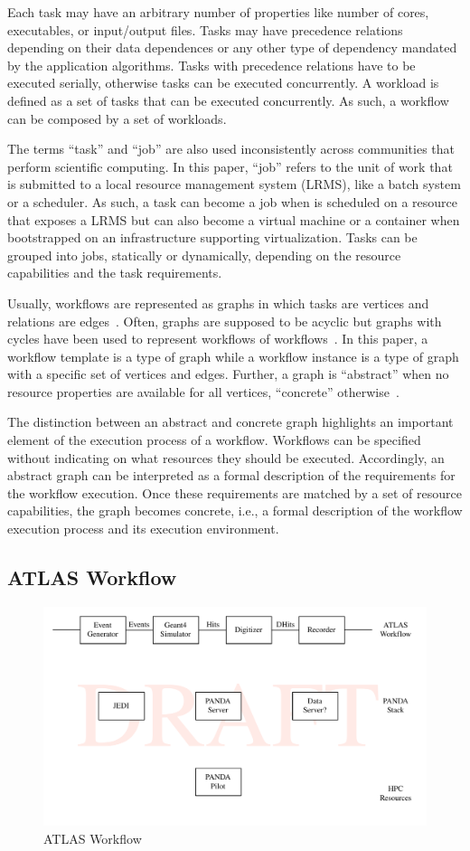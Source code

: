 Each task may have an arbitrary number of properties like number of cores,
executables, or input/output files. Tasks may have precedence relations
depending on their data dependences or any other type of dependency mandated
by the application algorithms. Tasks with precedence relations have to be
executed serially, otherwise tasks can be executed concurrently. A workload is
defined as a set of tasks that can be executed concurrently. As such, a
workflow can be composed by a set of workloads.

The terms ``task'' and ``job'' are also used inconsistently across communities
that perform scientific computing. In this paper, ``job'' refers to the unit of
work that is submitted to a local resource management system (LRMS), like a
batch system or a scheduler. As such, a task can become a job when is scheduled
on a resource that exposes a LRMS but can also become a virtual machine or a
container when bootstrapped on an infrastructure supporting virtualization.
Tasks can be grouped into jobs, statically or dynamically, depending on the
resource capabilities and the task requirements.

Usually, workflows are represented as graphs in which tasks are vertices and
relations are edges~\cite{}. Often, graphs are supposed to be acyclic but graphs
with cycles have been used to represent workflows of workflows~\cite{}. In this
paper, a workflow template is a type of graph while a workflow instance is a
type of graph with a specific set of vertices and edges. Further, a graph is
``abstract'' when no resource properties are available for all vertices,
``concrete'' otherwise~\cite{}.

The distinction between an abstract and concrete graph highlights an important
element of the execution process of a workflow. Workflows can be specified
without indicating on what resources they should be executed. Accordingly, an
abstract graph can be interpreted as a formal description of the requirements
for the workflow execution. Once these requirements are matched by a set of
resource capabilities, the graph becomes concrete, i.e., a formal description
of the workflow execution process and its execution environment.

\subsection{ATLAS Workflow}

\begin{figure}
  \includegraphics[width=\columnwidth]{figures/atlas_workflow.pdf}
  \caption{ATLAS Workflow}
\label{fig:atlas_workflow}
\end{figure}
